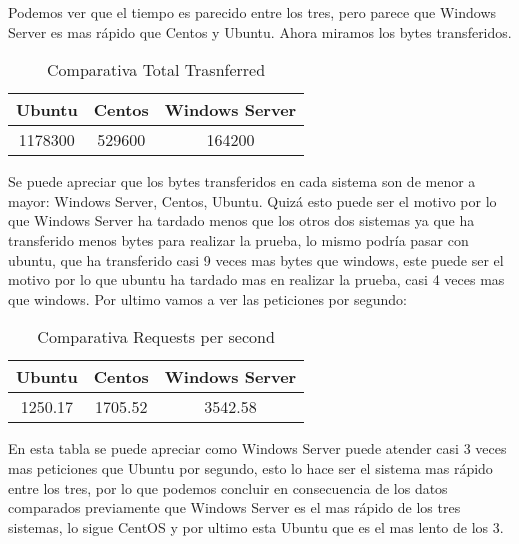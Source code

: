Podemos ver que el tiempo es parecido entre los tres, pero parece que Windows Server es mas rápido que Centos y Ubuntu.
Ahora miramos los bytes transferidos.
\begin{table}[H]
\centering
\begin{tabular}{|c|c|c|}
\hline
{\bf Ubuntu} & {\bf Centos} & {\bf Windows Server} \\
\hline
1178300 & 529600 & 164200 \\
\hline
\end{tabular}  
\caption{Comparativa Total Trasnferred} \label{tab:tabla2}
\end{table} 
Se puede apreciar que los bytes transferidos en cada sistema son de menor a mayor: Windows Server, Centos, Ubuntu. Quizá esto puede ser el motivo por lo que Windows Server ha tardado menos que los otros dos sistemas ya que ha transferido menos bytes para realizar la prueba, lo mismo podría pasar con ubuntu, que ha transferido casi 9 veces mas bytes que windows, este puede ser el motivo por lo que ubuntu ha tardado mas en realizar la prueba, casi 4 veces mas que windows. Por ultimo vamos a ver las peticiones por segundo:
\begin{table}[H]
\centering
\begin{tabular}{|c|c|c|}
\hline
{\bf Ubuntu} & {\bf Centos} & {\bf Windows Server} \\
\hline
1250.17 & 1705.52 & 3542.58 \\
\hline
\end{tabular}  
\caption{Comparativa Requests per second} \label{tab:tabla3}
\end{table} 
En esta tabla se puede apreciar como Windows Server puede atender casi 3 veces mas peticiones que Ubuntu por segundo, esto lo hace ser el sistema mas rápido entre los tres, por lo que podemos concluir en consecuencia de los datos comparados previamente que Windows Server es el mas rápido de los tres sistemas, lo sigue CentOS y por ultimo esta Ubuntu que es el mas lento de los 3.
